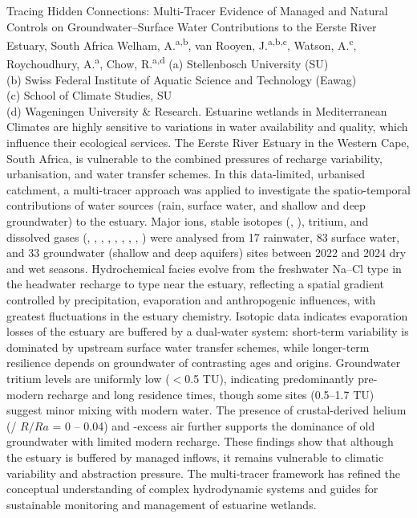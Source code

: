 \begin{conf-abstract}
{Tracing Hidden Connections: Multi-Tracer Evidence of Managed and Natural Controls on Groundwater–Surface Water Contributions to the Eerste River Estuary, South Africa}
{Welham, A.\textsuperscript{a,b}, van Rooyen, J.\textsuperscript{a,b,c}, Watson, A.\textsuperscript{c}, Roychoudhury, A.\textsuperscript{a}, Chow, R.\textsuperscript{a,d}}
{(a) Stellenbosch University (SU)\\
(b) Swiss Federal Institute of Aquatic Science and Technology (Eawag)\\
(c) School of Climate Studies, SU\\
(d) Wageningen University \& Research.}
{Estuarine wetlands in Mediterranean Climates are highly sensitive to variations in water availability and quality, which influence their ecological services. The Eerste River Estuary in the Western Cape, South Africa, is vulnerable to the combined pressures of recharge variability, urbanisation, and water transfer schemes. In this data-limited, urbanised catchment, a multi-tracer approach was applied to investigate the spatio-temporal contributions of water sources (rain, surface water, and shallow and deep groundwater) to the estuary. Major ions, stable isotopes (, ), tritium, and dissolved gases (, , , , , , , , ) were analysed from 17 rainwater, 83 surface water, and 33 groundwater (shallow and deep aquifers) sites between 2022 and 2024 dry and wet seasons. Hydrochemical facies evolve from the freshwater Na–Cl type in the headwater recharge to  type near the estuary, reflecting a spatial gradient controlled by precipitation, evaporation and anthropogenic influences, with greatest fluctuations in the estuary chemistry. Isotopic data indicates evaporation losses of the estuary are buffered by a dual-water system: short-term variability is dominated by upstream surface water transfer schemes, while longer-term resilience depends on groundwater of contrasting ages and origins. Groundwater tritium levels are uniformly low ($<$0.5 TU), indicating predominantly pre-modern recharge and long residence times, though some sites (0.5–1.7 TU) suggest minor mixing with modern water. The presence of crustal-derived helium (/ $R/Ra$ = 0 – 0.04) and -excess air further supports the dominance of old groundwater with limited modern recharge. These findings show that although the estuary is buffered by managed inflows, it remains vulnerable to climatic variability and abstraction pressure. The multi-tracer framework has refined the conceptual understanding of complex hydrodynamic systems and guides for sustainable monitoring and management of estuarine wetlands.
}
\end{conf-abstract}
